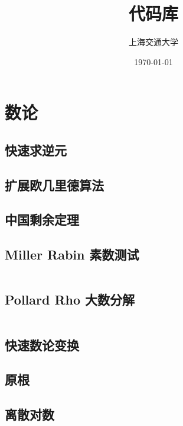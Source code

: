 \documentclass[a4paper]{article}
\title{代码库}
\author{上海交通大学}
\date{\today}
\newcommand{\cppcode}[1]{
    \inputminted[mathescape]{cpp}{source/#1}
}
\begin{document}
\maketitle

\tableofcontents

\clearpage

\section{数论}

\subsection{快速求逆元}


\subsection{扩展欧几里德算法}


\subsection{中国剩余定理}


\subsection{Miller Rabin 素数测试}

\cppcode{number-theory/miller-rabin.cpp}

\subsection{Pollard Rho 大数分解}

\cppcode{number-theory/pollard-rho.cpp}

\subsection{快速数论变换}

\subsection{原根}

\subsection{离散对数}
\end{document}
